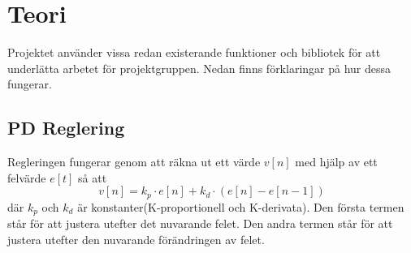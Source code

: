\documentclass[\docdir/tech.tex]{subfiles}
\begin{document}
\section{Teori}
Projektet använder vissa redan existerande funktioner och bibliotek för att
underlätta arbetet för projektgruppen. Nedan finns förklaringar på hur dessa
fungerar.

\subsection{PD Reglering}

Regleringen fungerar genom att räkna ut ett värde $v[n]$ med hjälp av ett
felvärde $e[t]$ så att 
\begin{equation*} v[n] = k_p \cdot e[n] + k_d \cdot (e[n]-e[n-1])\end{equation*} 
där $k_p$ och $k_d$ är konstanter(K-proportionell och K-derivata). Den första
termen står för att justera utefter det nuvarande felet. Den andra termen står
för att justera utefter den nuvarande förändringen av felet.
\end{document}
